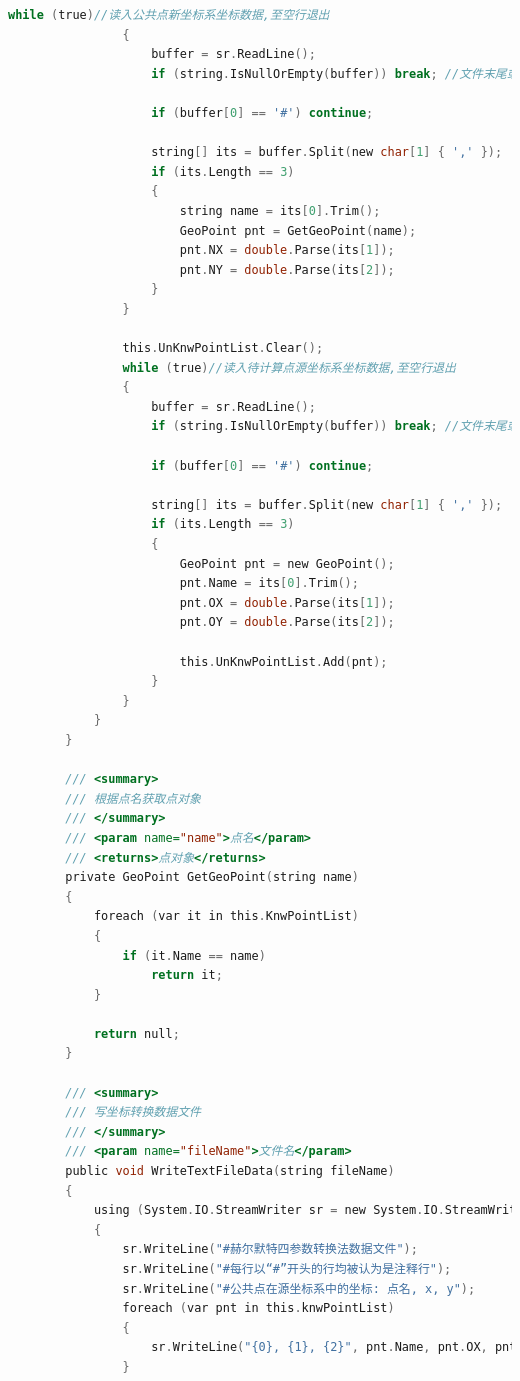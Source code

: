 \begin{lstlisting}[language=C]
                while (true)//读入公共点新坐标系坐标数据,至空行退出
                {
                    buffer = sr.ReadLine();
                    if (string.IsNullOrEmpty(buffer)) break; //文件末尾或空行退出

                    if (buffer[0] == '#') continue;

                    string[] its = buffer.Split(new char[1] { ',' });
                    if (its.Length == 3)
                    {
                        string name = its[0].Trim();
                        GeoPoint pnt = GetGeoPoint(name);
                        pnt.NX = double.Parse(its[1]);
                        pnt.NY = double.Parse(its[2]);
                    }
                }

                this.UnKnwPointList.Clear();
                while (true)//读入待计算点源坐标系坐标数据,至空行退出
                {
                    buffer = sr.ReadLine();
                    if (string.IsNullOrEmpty(buffer)) break; //文件末尾或空行退出

                    if (buffer[0] == '#') continue;

                    string[] its = buffer.Split(new char[1] { ',' });
                    if (its.Length == 3)
                    {
                        GeoPoint pnt = new GeoPoint();
                        pnt.Name = its[0].Trim();
                        pnt.OX = double.Parse(its[1]);
                        pnt.OY = double.Parse(its[2]);

                        this.UnKnwPointList.Add(pnt);
                    }
                }
            }
        }
     
        /// <summary>
        /// 根据点名获取点对象
        /// </summary>
        /// <param name="name">点名</param>
        /// <returns>点对象</returns>
        private GeoPoint GetGeoPoint(string name)
        {
            foreach (var it in this.KnwPointList)
            {
                if (it.Name == name)
                    return it;
            }

            return null;
        }

        /// <summary>
        /// 写坐标转换数据文件
        /// </summary>
        /// <param name="fileName">文件名</param>
        public void WriteTextFileData(string fileName)
        {
            using (System.IO.StreamWriter sr = new System.IO.StreamWriter(fileName))
            {
                sr.WriteLine("#赫尔默特四参数转换法数据文件");
                sr.WriteLine("#每行以“#”开头的行均被认为是注释行");
                sr.WriteLine("#公共点在源坐标系中的坐标: 点名, x, y");
                foreach (var pnt in this.knwPointList)
                {
                    sr.WriteLine("{0}, {1}, {2}", pnt.Name, pnt.OX, pnt.OY);
                }


\end{lstlisting}
